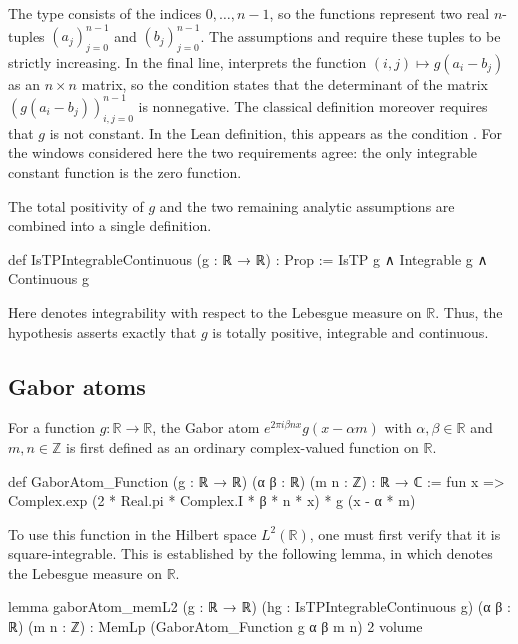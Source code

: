 \documentclass[reqno,a4paper,12pt]{amsart}
\numberwithin{equation}{section}
\def\Z{{\mathbb Z}}
\def\R{{\mathbb R}}
\newcommand\1{\mathds{1}}
\begin{document}
The type  consists of the indices $0,\ldots,n-1$, so the functions
 represent two real $n$-tuples $(a_j)_{j=0}^{n-1}$ and $(b_j)_{j=0}^{n-1}$. The assumptions  and  require these tuples to be strictly increasing. In the final line,  interprets the function $(i,j) \mapsto g(a_i - b_j)$ as an $n \times n$ matrix, so the condition states that the determinant of the matrix $(g(a_i-b_j))_{i,j=0}^{n-1}$ is nonnegative. The classical definition moreover requires that $g$ is not constant. In the Lean definition, this appears as the condition . For the windows considered here the two requirements agree: the only integrable constant function is the zero function.

The total positivity of $g$ and the two remaining analytic assumptions are combined into a single definition.

\begin{leancode}
def IsTPIntegrableContinuous (g : ℝ → ℝ) : Prop :=
  IsTP g ∧ Integrable g ∧ Continuous g
\end{leancode}

Here  denotes integrability with respect to the Lebesgue measure on $\R$. Thus, the hypothesis  asserts exactly that
$g$ is totally positive, integrable and continuous.

\subsection{Gabor atoms}

For a function $g : \R \to \R$, the Gabor atom $e^{2\pi i \beta n x} g(x-\alpha m)$ with $\alpha,\beta \in \R$ and $m,n \in \Z$ is first defined as an ordinary complex-valued function on $\R$.

\begin{leancode}
def GaborAtom_Function
    (g : ℝ → ℝ) (α β : ℝ) (m n : ℤ) : ℝ → ℂ :=
    fun x =>
    Complex.exp (2 * Real.pi * Complex.I * β * n * x) * g (x - α * m)
\end{leancode}

To use this function in the Hilbert space $L^2(\mathbb{R})$, one must first verify that it is square-integrable. This is established by the following lemma, in which  denotes the Lebesgue measure on $\R$.

\begin{leancode}
lemma gaborAtom_memL2
    (g : ℝ → ℝ) (hg : IsTPIntegrableContinuous g)
    (α β : ℝ) (m n : ℤ) :
    MemLp (GaborAtom_Function g α β m n) 2 volume
\end{leancode}
\end{document}
